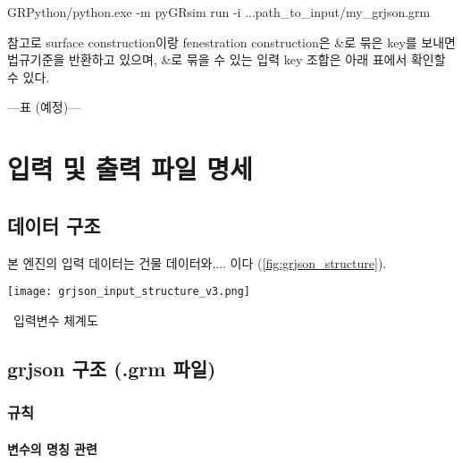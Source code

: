 \begin{tcolorbox}[colback=gray!10, colframe=gray!80, boxrule=0.5pt, left=1em, right=1em]
GRPython/python.exe -m pyGRsim run -i ...path\_to\_input/my\_grjson.grm
\end{tcolorbox}

참고로 surface construction이랑 fenestration construction은 \&로 묶은 key를 보내면 법규기준을 반환하고 있으며, \&로 묶을 수 있는 입력 key 조합은 아래 표에서 확인할 수 있다.

---표 (예정)---

\chapter{입력 및 출력 파일 명세}

\section{ 데이터 구조}
본 엔진의 입력 데이터는 건물 데이터와,... 이다 (\ref{fig:grjson_structure}).

\begin{defaultfigure}
  \texttt{[image: grjson\_input\_structure\_v3.png]}
  \caption{\simulator\ 입력변수 체계도}
  \label{fig:grjson_structure}
\end{defaultfigure}


\section{grjson 구조 (.grm 파일)}

\subsection{규칙}

\subsubsection{변수의 명칭 관련}

